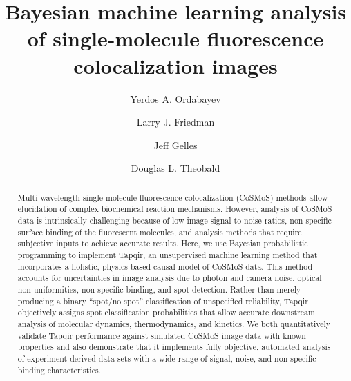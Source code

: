 \documentclass[9pt,lineno]{elife}
\title{Bayesian machine learning analysis of single-molecule fluorescence colocalization images}
\author[1]{Yerdos A. Ordabayev}
\author[1]{Larry  J. Friedman}
\author[1*]{Jeff Gelles}
\author[1*]{Douglas L. Theobald}
\affil[1]{Department of Biochemistry, Brandeis University, Waltham, MA 02454 USA}
\begin{document}
\maketitle

\begin{abstract} %
Multi-wavelength single-molecule fluorescence colocalization (CoSMoS) methods allow elucidation of complex biochemical reaction mechanisms. However, analysis of CoSMoS data is intrinsically challenging because of low image signal-to-noise ratios, non-specific surface binding of the fluorescent molecules, and analysis methods that require subjective inputs to achieve accurate results. Here, we use Bayesian probabilistic programming to implement Tapqir, an unsupervised machine learning method that incorporates a holistic, physics-based causal model of CoSMoS data.  This method accounts for uncertainties in image analysis due to photon and camera noise, optical non-uniformities, non-specific binding, and spot detection. Rather than merely producing a binary ``spot/no spot'' classification of unspecified reliability, Tapqir objectively assigns spot classification probabilities that allow accurate downstream analysis of molecular dynamics, thermodynamics, and kinetics.   We both quantitatively validate Tapqir performance against simulated CoSMoS image data with known properties and also demonstrate that it implements fully objective, automated analysis of experiment-derived data sets with a wide range of signal, noise, and non-specific binding characteristics. 
\end{abstract}











% 


% 

% 


\end{document}
